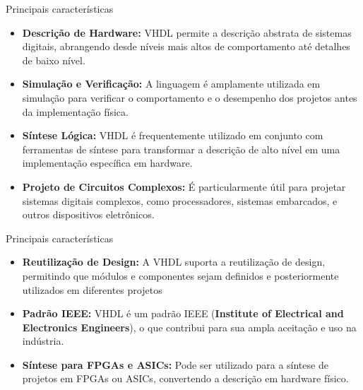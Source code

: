 \documentclass[aspectratio=169]{beamer}
\begin{document}
\begin{frame}{Principais características}
\justifying
	
	\begin{itemize}
		\justifying
		\item \textbf{Descrição de Hardware:} VHDL permite a descrição abstrata de sistemas digitais, abrangendo desde níveis mais altos de comportamento até detalhes de baixo nível.
		\item \textbf{Simulação e Verificação:} A linguagem é amplamente utilizada em simulação para verificar o comportamento e o desempenho dos projetos antes da implementação física.
		\item \textbf{Síntese Lógica:} VHDL é frequentemente utilizado em conjunto com ferramentas de síntese para transformar a descrição de alto nível em uma implementação específica em hardware.
		\item \textbf{Projeto de Circuitos Complexos:} É particularmente útil para projetar sistemas digitais complexos, como processadores, sistemas embarcados, e outros dispositivos eletrônicos.

	\end{itemize}
	
	
\end{frame}



\begin{frame}{Principais características}
	\justifying
	
	\begin{itemize}
		\justifying

		\item \textbf{Reutilização de Design:} A VHDL suporta a reutilização de design, permitindo que módulos e componentes sejam definidos e posteriormente utilizados em diferentes projetos
		\item \textbf{Padrão IEEE:} VHDL é um padrão IEEE (\textbf{Institute of Electrical and Electronics Engineers}), o que contribui para sua ampla aceitação e uso na indústria.
		\item \textbf{Síntese para FPGAs e ASICs:} Pode ser utilizado para a síntese de projetos em FPGAs ou ASICs, convertendo a descrição em hardware físico.
	\end{itemize}
	
	
\end{frame}
\end{document}
